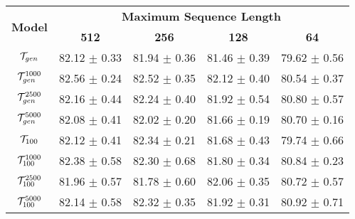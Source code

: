 \begin{table*}[t]
\begin{subtable}{\textwidth}
\begin{tabular}{ccccc}
            \hline
        \end{tabular}
        \caption{ADE}
    \end{subtable}

    \bigskip
    \begin{subtable}{\textwidth}
    \centering
        \begin{tabular}{ccccc}
            \hline
            
            \multirow{2}{*}{\textbf{Model}}         & \multicolumn{4}{c}{\textbf{Maximum Sequence Length}}  \\          
            
                                                    & \textbf{512}  & \textbf{256}   & \textbf{128}   & \textbf{64} \\ 
            
            \hline
    
            $\mathcal{T}_{gen}$                               & 82.12 $\pm$ 0.33      & 81.94 $\pm$ 0.36      & 81.46 $\pm$ 0.39      & 79.62 $\pm$ 0.56  \\         
            $\mathcal{T}_{gen}^{1000}$                        & 82.56 $\pm$ 0.24      & 82.52 $\pm$ 0.35      & 82.12 $\pm$ 0.40      & 80.54 $\pm$ 0.37  \\ 
            $\mathcal{T}_{gen}^{2500}$                        & 82.16 $\pm$ 0.44      & 82.24 $\pm$ 0.40      & 81.92 $\pm$ 0.54      & 80.80 $\pm$ 0.57  \\ 
            $\mathcal{T}_{gen}^{5000}$                        & 82.08 $\pm$ 0.41      & 82.02 $\pm$ 0.20      & 81.66 $\pm$ 0.19      & 80.70 $\pm$ 0.16  \\ 
            $\tok100$                               & 82.12 $\pm$ 0.41      & 82.34 $\pm$ 0.21      & 81.68 $\pm$ 0.43      & 79.74 $\pm$ 0.66  \\ 
            $\tok100^{1000}$                        & 82.38 $\pm$ 0.58      & 82.30 $\pm$ 0.68      & 81.80 $\pm$ 0.34      & 80.84 $\pm$ 0.23  \\ 
            $\tok100^{2500}$                        & 81.96 $\pm$ 0.57      & 81.78 $\pm$ 0.60      & 82.06 $\pm$ 0.35      & 80.72 $\pm$ 0.57  \\ 
            $\tok100^{5000}$                        & 82.14 $\pm$ 0.58      & 82.32 $\pm$ 0.35      & 81.92 $\pm$ 0.31      & 80.92 $\pm$ 0.71  \\   
            
            \hline
        \end{tabular}
        \caption{LEDGAR}
    \end{subtable}


\end{table*}
